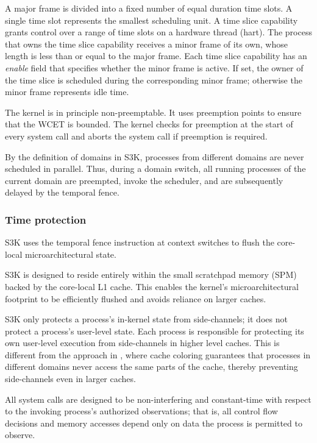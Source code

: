 A major frame is divided into a fixed number of equal duration time slots. A
single time slot represents the smallest scheduling unit. A time slice
capability grants control over a range of time slots on a hardware thread
(hart). The process that owns the time slice capability receives a minor frame
of its own, whose length is less than or equal to the major frame. Each time
slice capability has an \emph{enable} field that specifies whether the minor
frame is active. If set, the owner of the time slice is scheduled during the
corresponding minor frame; otherwise the minor frame represents idle time.

The kernel is in principle non-preemptable. It uses preemption points to ensure
that the WCET is bounded. The kernel checks for preemption at the start of
every system call and aborts the system call if preemption is required.

By the definition of domains in S3K, processes from different domains are never
scheduled in parallel. Thus, during a domain switch, all running processes of
the current domain are preempted, invoke the scheduler, and are subsequently
delayed by the temporal fence.

\subsubsection{Time protection}
S3K uses the temporal fence instruction at context switches to flush the
core-local microarchitectural state.

S3K is designed to reside entirely within the small scratchpad memory (SPM)
backed by the core-local L1 cache. This enables the kernel's microarchitectural
footprint to be efficiently flushed and avoids reliance on larger caches.

S3K only protects a process's in-kernel state from side-channels; it does not
protect a process's user-level state. Each process is responsible for protecting
its own user-level execution from side-channels in higher level caches. This is
different from the approach in \cite{ge2019}, where cache coloring guarantees
that processes in different domains never access the same parts of the cache,
thereby preventing side-channels even in larger caches.

All system calls are designed to be non-interfering and constant-time with
respect to the invoking process's authorized observations; that is, all control
flow decisions and memory accesses depend only on data the process is permitted
to observe.

